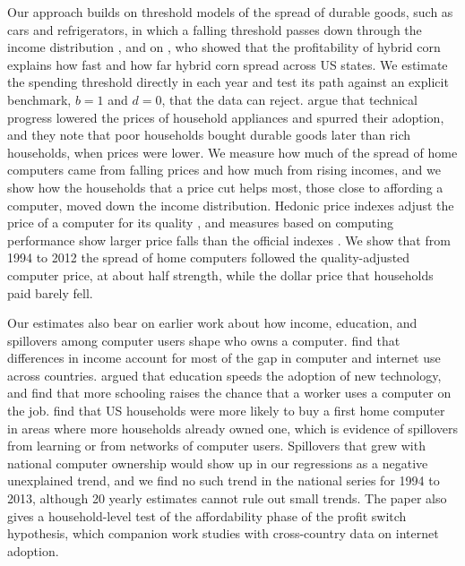 \documentclass[11pt]{article}
\begin{document}
Our approach builds on threshold models of the spread of durable goods, such as cars and refrigerators, in which a falling threshold passes down through the income distribution \citep{david1969,bonus1973,geroski2000}, and on \citet{griliches1957}, who showed that the profitability of hybrid corn explains how fast and how far hybrid corn spread across US states. We estimate the spending threshold directly in each year and test its path against an explicit benchmark, $b = 1$ and $d = 0$, that the data can reject. \citet{greenwood2005} argue that technical progress lowered the prices of household appliances and spurred their adoption, and they note that poor households bought durable goods later than rich households, when prices were lower. We measure how much of the spread of home computers came from falling prices and how much from rising incomes, and we show how the households that a price cut helps most, those close to affording a computer, moved down the income distribution. Hedonic price indexes adjust the price of a computer for its quality \citep{berndt2001,pakes2003}, and measures based on computing performance show larger price falls than the official indexes \citep{nordhaus2007}. We show that from 1994 to 2012 the spread of home computers followed the quality-adjusted computer price, at about half strength, while the dollar price that households paid barely fell.

Our estimates also bear on earlier work about how income, education, and spillovers among computer users shape who owns a computer. \citet{chinn2007} find that differences in income account for most of the gap in computer and internet use across countries. \citet{nelson1966} argued that education speeds the adoption of new technology, and \citet{riddell2017} find that more schooling raises the chance that a worker uses a computer on the job. \citet{goolsbee2002} find that US households were more likely to buy a first home computer in areas where more households already owned one, which is evidence of spillovers from learning or from networks of computer users. Spillovers that grew with national computer ownership would show up in our regressions as a negative unexplained trend, and we find no such trend in the national series for 1994 to 2013, although 20 yearly estimates cannot rule out small trends. The paper also gives a household-level test of the affordability phase of the profit switch hypothesis, which companion work studies with cross-country data on internet adoption.
\end{document}
